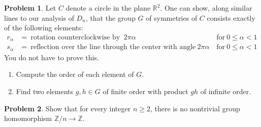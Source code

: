 \documentclass[11pt]{article}
\newcommand{\Z}{\mathbb{Z}}
\newcommand{\R}{\mathbb{R}}
\theoremstyle{definition}
\newtheorem{problem}{Problem}
\begin{document}
\begin{problem}
	Let $C$ denote a circle in the plane $\R^2$. One can show, along similar lines to our analysis of $D_n$, that the group $G$ of symmetries of $C$ consists exactly of the following elements:
	\[\begin{aligned}  r_\alpha &= \ \text{rotation counterclockwise by } \ 2 \pi \alpha \quad &\text{for} \ 0\leq \alpha <1 \\
s_\alpha &= \ \text{reflection over the line through the center with angle} \ 2 \pi \alpha \qquad &\text{for} \ 0\leq \alpha <1\end{aligned}\]
You do not have to prove this. 
\begin{enumerate}[(4.1)]
\item Compute the order of each element of $G$.
\item Find two elements $g,h\in G$ of finite order with product $gh$ of infinite order.
\end{enumerate}
\end{problem}

\begin{problem}
Show that for every integer $n \geqslant 2$, there is no nontrivial group homomorphism $\Z/n \longrightarrow \Z$.
\end{problem}
\end{document}
